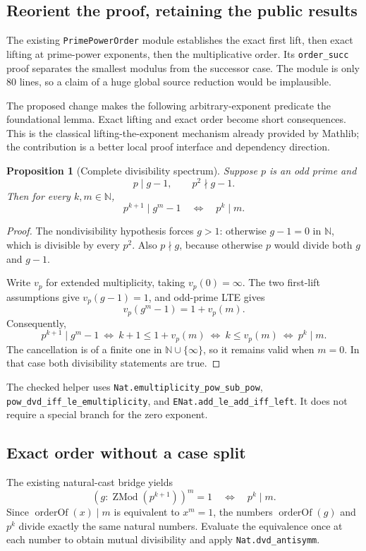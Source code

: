 \documentclass[11pt]{article}
\newcommand{\N}{\mathbb N}
\newcommand{\code}[1]{\nolinkurl{#1}}
\newtheorem{proposition}{Proposition}[section]
\begin{document}
\subsection{Reorient the proof, retaining the public results}
The existing \code{PrimePowerOrder} module establishes the exact first lift,
then exact lifting at prime-power exponents, then the multiplicative order. Its
\code{order_succ} proof separates the smallest modulus from the successor case.
The module is only 80 lines, so a claim of a huge global source reduction would
be implausible.\cite{primepower}

The proposed change makes the following arbitrary-exponent predicate the
foundational lemma. Exact lifting and exact order become short consequences.
This is the classical lifting-the-exponent mechanism already provided by
Mathlib; the contribution is a better local proof interface and dependency
direction.\cite{mathliblte}

\begin{proposition}[Complete divisibility spectrum]
Suppose \(p\) is an odd prime and
\[
 p\mid g-1,\qquad p^2\nmid g-1.
\]
Then for every \(k,m\in\N\),
\begin{equation}\label{eq:spectrum}
 p^{k+1}\mid g^m-1
 \quad\Longleftrightarrow\quad
 p^k\mid m.
\end{equation}
\end{proposition}
\begin{proof}
The nondivisibility hypothesis forces \(g>1\): otherwise \(g-1=0\) in
\(\N\), which is divisible by every \(p^2\). Also \(p\nmid g\), because
otherwise \(p\) would divide both \(g\) and \(g-1\).

Write \(v_p\) for extended multiplicity, taking \(v_p(0)=\infty\).
The two first-lift assumptions give \(v_p(g-1)=1\), and odd-prime LTE gives
\[
 v_p(g^m-1)=1+v_p(m).
\]
Consequently,
\[
 p^{k+1}\mid g^m-1
 \ \Longleftrightarrow\ k+1\le1+v_p(m)
 \ \Longleftrightarrow\ k\le v_p(m)
 \ \Longleftrightarrow\ p^k\mid m.
\]
The cancellation is of a finite one in \(\N\cup\{\infty\}\), so it remains
valid when \(m=0\). In that case both divisibility statements are true.
\end{proof}
The checked helper uses
\code{Nat.emultiplicity_pow_sub_pow},
\code{pow_dvd_iff_le_emultiplicity}, and
\code{ENat.add_le_add_iff_left}. It does not require a special branch for the
zero exponent.

\subsection{Exact order without a case split}
The existing natural-cast bridge yields
\[
 (g:\operatorname{ZMod}(p^{k+1}))^m=1
 \quad\Longleftrightarrow\quad p^k\mid m.
\]
Since \(\operatorname{orderOf}(x)\mid m\) is equivalent to \(x^m=1\), the
numbers \(\operatorname{orderOf}(g)\) and \(p^k\) divide exactly the same
natural numbers. Evaluate the equivalence once at each number to obtain mutual
divisibility and apply \code{Nat.dvd_antisymm}.
\end{document}
